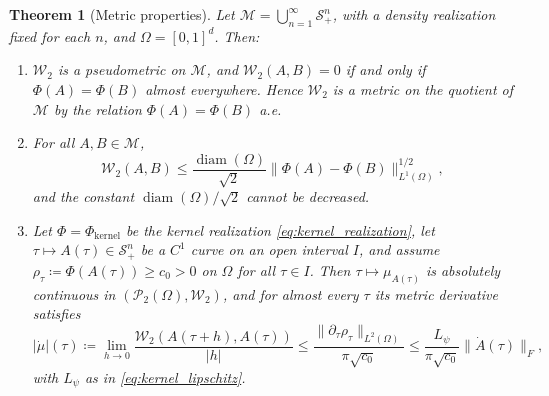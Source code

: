\documentclass[11pt,a4paper,reqno]{amsart}
\newtheorem{theorem}{Theorem}[section]
\theoremstyle{definition}
\numberwithin{equation}{section}
\newcommand{\diam}{\operatorname{diam}}
\begin{document}
\begin{theorem}[Metric properties]
\label{thm:wasserstein_properties}
Let $\mathcal{M} = \bigcup_{n=1}^\infty \mathcal{S}_+^n$, with a density realization fixed for each $n$, and $\Omega = [0,1]^d$. Then:
\begin{enumerate}[label=(\alph*)]
    \item $\mathcal{W}_2$ is a pseudometric on $\mathcal{M}$, and $\mathcal{W}_2(A,B) = 0$ if and only if $\Phi(A) = \Phi(B)$ almost everywhere. Hence $\mathcal{W}_2$ is a metric on the quotient of $\mathcal{M}$ by the relation $\Phi(A) = \Phi(B)$ a.e.
    \item For all $A, B \in \mathcal{M}$,
    \begin{equation}
        \mathcal{W}_2(A, B) \le \frac{\diam(\Omega)}{\sqrt{2}} \|\Phi(A) - \Phi(B)\|_{L^1(\Omega)}^{1/2},
        \label{eq:w2_l1}
    \end{equation}
    and the constant $\diam(\Omega)/\sqrt{2}$ cannot be decreased.
    \item Let $\Phi = \Phi_{\mathrm{kernel}}$ be the kernel realization \eqref{eq:kernel_realization}, let $\tau \mapsto A(\tau) \in \mathcal{S}_+^n$ be a $C^1$ curve on an open interval $I$, and assume $\rho_\tau \coloneqq \Phi(A(\tau)) \ge c_0 > 0$ on $\Omega$ for all $\tau \in I$. Then $\tau \mapsto \mu_{A(\tau)}$ is absolutely continuous in $(\mathcal{P}_2(\Omega), \mathcal{W}_2)$, and for almost every $\tau$ its metric derivative satisfies
    \begin{equation}
        |\dot{\mu}|(\tau) \coloneqq \lim_{h \to 0} \frac{\mathcal{W}_2(A(\tau+h), A(\tau))}{|h|} \le \frac{\|\partial_\tau \rho_\tau\|_{L^2(\Omega)}}{\pi \sqrt{c_0}} \le \frac{L_\psi}{\pi \sqrt{c_0}} \|\dot{A}(\tau)\|_F,
        \label{eq:metric_speed}
    \end{equation}
    with $L_\psi$ as in \eqref{eq:kernel_lipschitz}.
\end{enumerate}
\end{theorem}
\end{document}
